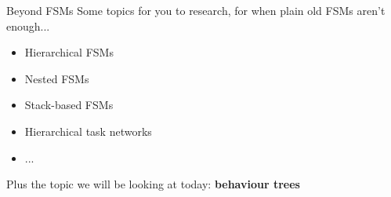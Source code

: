 \begin{frame}{Beyond FSMs}
    Some topics for you to research, for when plain old FSMs aren't enough... \pause
    \begin{itemize}
        \item Hierarchical FSMs
        \item Nested FSMs
        \item Stack-based FSMs
        \item Hierarchical task networks
        \item ...
    \end{itemize}
		Plus the topic we will be looking at today: \textbf{behaviour trees}
\end{frame}
